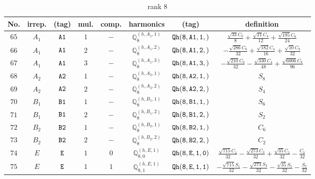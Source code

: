 \documentclass[fleqn,8pt]{jsarticle}
\begin{document}
\begin{table}[ht!]
\begin{center}
\caption{rank 8}
\renewcommand{\arraystretch}{1.3}
\begin{tabular}{cccccccc} \hline \hline
No. & irrep. & (tag) & mul. & comp. & harmonics & (tag) & definition \\ \hline
$ 65 $ & $ A_{1} $ & $ {\tt A1} $ & $ 1 $ & $ - $ & $ \mathbb{Q}_{8}^{(h,A_{1},1)} $ & $ {\tt Qh(8,A1,1,)} $ & $ \frac{\sqrt{33} C_{0}}{8} + \frac{\sqrt{21} C_{4}}{12} + \frac{\sqrt{195} C_{8}}{24} $ \\
$ 66 $ & $ A_{1} $ & $ {\tt A1} $ & $ 2 $ & $ - $ & $ \mathbb{Q}_{8}^{(h,A_{1},2)} $ & $ {\tt Qh(8,A1,2,)} $ & $ - \frac{\sqrt{286} C_{0}}{32} + \frac{\sqrt{182} C_{4}}{16} + \frac{\sqrt{10} C_{8}}{32} $ \\
$ 67 $ & $ A_{1} $ & $ {\tt A1} $ & $ 3 $ & $ - $ & $ \mathbb{Q}_{8}^{(h,A_{1},3)} $ & $ {\tt Qh(8,A1,3,)} $ & $ - \frac{\sqrt{210} C_{0}}{32} - \frac{\sqrt{330} C_{4}}{48} + \frac{\sqrt{6006} C_{8}}{96} $ \\
$ 68 $ & $ A_{2} $ & $ {\tt A2} $ & $ 1 $ & $ - $ & $ \mathbb{Q}_{8}^{(h,A_{2},1)} $ & $ {\tt Qh(8,A2,1,)} $ & $ S_{8} $ \\
$ 69 $ & $ A_{2} $ & $ {\tt A2} $ & $ 2 $ & $ - $ & $ \mathbb{Q}_{8}^{(h,A_{2},2)} $ & $ {\tt Qh(8,A2,2,)} $ & $ S_{4} $ \\
$ 70 $ & $ B_{1} $ & $ {\tt B1} $ & $ 1 $ & $ - $ & $ \mathbb{Q}_{8}^{(h,B_{1},1)} $ & $ {\tt Qh(8,B1,1,)} $ & $ S_{6} $ \\
$ 71 $ & $ B_{1} $ & $ {\tt B1} $ & $ 2 $ & $ - $ & $ \mathbb{Q}_{8}^{(h,B_{1},2)} $ & $ {\tt Qh(8,B1,2,)} $ & $ S_{2} $ \\
$ 72 $ & $ B_{2} $ & $ {\tt B2} $ & $ 1 $ & $ - $ & $ \mathbb{Q}_{8}^{(h,B_{2},1)} $ & $ {\tt Qh(8,B2,1,)} $ & $ C_{6} $ \\
$ 73 $ & $ B_{2} $ & $ {\tt B2} $ & $ 2 $ & $ - $ & $ \mathbb{Q}_{8}^{(h,B_{2},2)} $ & $ {\tt Qh(8,B2,2,)} $ & $ C_{2} $ \\
$ 74 $ & $ E $ & $ {\tt E} $ & $ 1 $ & $ 0 $ & $ \mathbb{Q}_{8,0}^{(h,E,1)} $ & $ {\tt Qh(8,E,1,0)} $ & $ \frac{\sqrt{715} C_{1}}{32} - \frac{\sqrt{273} C_{3}}{32} + \frac{\sqrt{35} C_{5}}{32} - \frac{C_{7}}{32} $ \\
$ 75 $ & $ E $ & $ {\tt E} $ & $ 1 $ & $ 1 $ & $ \mathbb{Q}_{8,1}^{(h,E,1)} $ & $ {\tt Qh(8,E,1,1)} $ & $ - \frac{\sqrt{715} S_{1}}{32} - \frac{\sqrt{273} S_{3}}{32} - \frac{\sqrt{35} S_{5}}{32} - \frac{S_{7}}{32} $ \\

\end{tabular}
\end{center}
\end{table}
\end{document}
